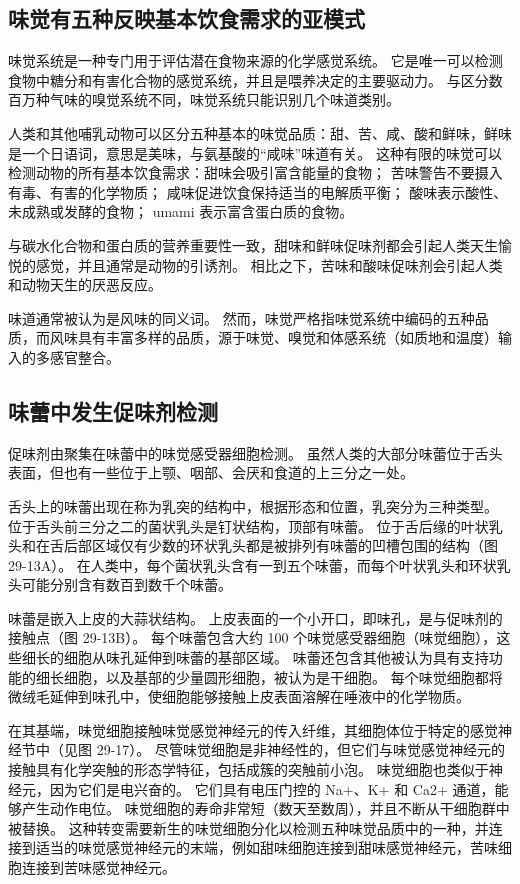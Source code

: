 \subsection{味觉有五种反映基本饮食需求的亚模式}
味觉系统是一种专门用于评估潜在食物来源的化学感觉系统。 它是唯一可以检测食物中糖分和有害化合物的感觉系统，并且是喂养决定的主要驱动力。 与区分数百万种气味的嗅觉系统不同，味觉系统只能识别几个味道类别。

人类和其他哺乳动物可以区分五种基本的味觉品质：甜、苦、咸、酸和鲜味，鲜味是一个日语词，意思是美味，与氨基酸的“咸味”味道有关。 这种有限的味觉可以检测动物的所有基本饮食需求：甜味会吸引富含能量的食物； 苦味警告不要摄入有毒、有害的化学物质； 咸味促进饮食保持适当的电解质平衡； 酸味表示酸性、未成熟或发酵的食物； umami 表示富含蛋白质的食物。

与碳水化合物和蛋白质的营养重要性一致，甜味和鲜味促味剂都会引起人类天生愉悦的感觉，并且通常是动物的引诱剂。 相比之下，苦味和酸味促味剂会引起人类和动物天生的厌恶反应。

味道通常被认为是风味的同义词。 然而，味觉严格指味觉系统中编码的五种品质，而风味具有丰富多样的品质，源于味觉、嗅觉和体感系统（如质地和温度）输入的多感官整合。



\subsection{味蕾中发生促味剂检测}
促味剂由聚集在味蕾中的味觉感受器细胞检测。 虽然人类的大部分味蕾位于舌头表面，但也有一些位于上颚、咽部、会厌和食道的上三分之一处。

舌头上的味蕾出现在称为乳突的结构中，根据形态和位置，乳突分为三种类型。 位于舌头前三分之二的菌状乳头是钉状结构，顶部有味蕾。 位于舌后缘的叶状乳头和在舌后部区域仅有少数的环状乳头都是被排列有味蕾的凹槽包围的结构（图 29-13A）。 在人类中，每个菌状乳头含有一到五个味蕾，而每个叶状乳头和环状乳头可能分别含有数百到数千个味蕾。

味蕾是嵌入上皮的大蒜状结构。 上皮表面的一个小开口，即味孔，是与促味剂的接触点（图 29-13B）。 每个味蕾包含大约 100 个味觉感受器细胞（味觉细胞），这些细长的细胞从味孔延伸到味蕾的基部区域。 味蕾还包含其他被认为具有支持功能的细长细胞，以及基部的少量圆形细胞，被认为是干细胞。 每个味觉细胞都将微绒毛延伸到味孔中，使细胞能够接触上皮表面溶解在唾液中的化学物质。

在其基端，味觉细胞接触味觉感觉神经元的传入纤维，其细胞体位于特定的感觉神经节中（见图 29-17）。 尽管味觉细胞是非神经性的，但它们与味觉感觉神经元的接触具有化学突触的形态学特征，包括成簇的突触前小泡。 味觉细胞也类似于神经元，因为它们是电兴奋的。 它们具有电压门控的 Na+、K+ 和 Ca2+ 通道，能够产生动作电位。 味觉细胞的寿命非常短（数天至数周），并且不断从干细胞群中被替换。 这种转变需要新生的味觉细胞分化以检测五种味觉品质中的一种，并连接到适当的味觉感觉神经元的末端，例如甜味细胞连接到甜味感觉神经元，苦味细胞连接到苦味感觉神经元。

